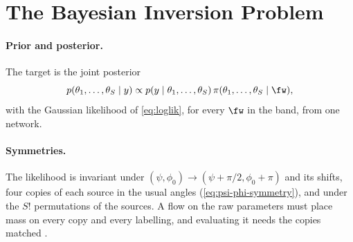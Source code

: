 \section{The Bayesian Inversion Problem}
\label{sec:inversion}\label{sec:problem}

\paragraph{Prior and posterior.}
The target is the joint posterior
\begin{equation}
  p(\theta_1,\dots,\theta_S \mid y) \propto p(y\mid\theta_1,\dots,\theta_S)\,\pi(\theta_1,\dots,\theta_S\mid\fw),
\end{equation}
with the Gaussian likelihood of \cref{eq:loglik}, for every $\fw$ in the band, from one network.

\paragraph{Symmetries.} The likelihood is invariant under $(\psi,\phi_0)\to(\psi+\pi/2,\phi_0+\pi)$
and its shifts, four copies of each source in the usual angles (\cref{eq:psi-phi-symmetry}), and
under the $S!$ permutations of the sources. A flow on the raw parameters must
place mass on every copy and every labelling, and evaluating it needs the copies matched
\citep{stephens2000dealing,jasra2005markov,buscicchio2019label}.
